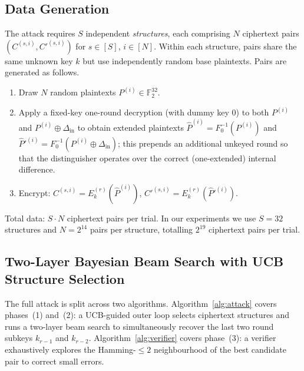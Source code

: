 \documentclass[runningheads]{llncs}
\newcommand{\xor}{\oplus}
\begin{document}
\subsection{Data Generation}
\label{subsec:datagen}

The attack requires $S$ independent \emph{structures}, each comprising
$N$ ciphertext pairs $(C^{(s,i)}, C'^{(s,i)})$ for $s \in [S]$,
$i \in [N]$.  Within each structure, pairs share the same unknown key
$k$ but use independently random base plaintexts.  Pairs are
generated as follows.

\begin{enumerate}
  \item Draw $N$ random plaintexts $P^{(i)} \in \mathbb{F}_2^{32}$.
  \item Apply a fixed-key one-round decryption (with dummy key $0$) to
    both $P^{(i)}$ and $P^{(i)} \xor \Delta_{\mathrm{in}}$ to obtain
    extended plaintexts
    $\hat{P}^{(i)} = F_0^{-1}(P^{(i)})$ and
    $\hat{P}'^{(i)} = F_0^{-1}(P^{(i)} \xor \Delta_{\mathrm{in}})$;
    this prepends an additional unkeyed round so that the distinguisher
    operates over the correct (one-extended) internal difference.
  \item Encrypt: $C^{(s,i)} = E_k^{(r)}(\hat{P}^{(i)})$,\;
    $C'^{(s,i)} = E_k^{(r)}(\hat{P}'^{(i)})$.
\end{enumerate}

Total data: $S \cdot N$ ciphertext pairs per trial.  In our experiments
we use $S = 32$ structures and $N = 2^{14}$ pairs per structure,
totalling $2^{19}$ ciphertext pairs per trial.

\subsection{Two-Layer Bayesian Beam Search with UCB Structure Selection}
\label{subsec:attack-alg}

The full attack is split across two algorithms.
Algorithm~\ref{alg:attack} covers phases~(1) and~(2): a UCB-guided
outer loop selects ciphertext structures and runs a two-layer beam
search to simultaneously recover the last two round subkeys
$k_{r-1}$ and $k_{r-2}$.
Algorithm~\ref{alg:verifier} covers phase~(3): a verifier exhaustively
explores the Hamming-$\le 2$ neighbourhood of the best candidate pair
to correct small errors.
\end{document}
